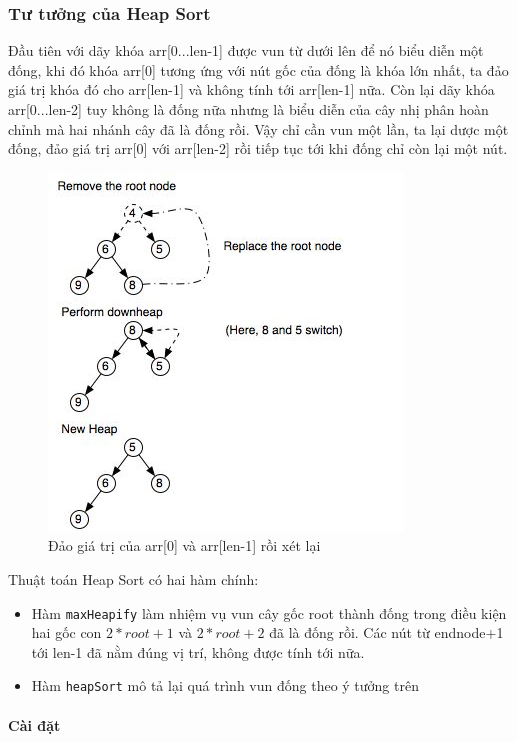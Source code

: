\documentclass[a4paper,12pt]{report}
\newcommand{\mnt}[1]{\inputminted[frame=single, linenos=true, tabsize=4]{c++}{#1}}
\begin{document}
\subsubsection{Tư tưởng của Heap Sort}

Đầu tiên với dãy khóa arr[0...len-1] được vun từ dưới lên để nó biểu diễn một đống, khi đó khóa arr[0] tương ứng với nút gốc của đống là khóa lớn nhất, ta đảo giá trị khóa đó cho arr[len-1] và không tính tới arr[len-1] nữa. Còn lại dãy khóa arr[0...len-2] tuy không là đống nữa nhưng là biểu diễn của cây nhị phân hoàn chỉnh mà hai nhánh cây đã là đống rồi. Vậy chỉ cần vun một lần, ta lại dược một đống, đảo giá trị arr[0] với arr[len-2] rồi tiếp tục tới khi đống chỉ còn lại một nút.
\begin{figure}[htp]
\centering
\includegraphics[scale=0.5]{img/tachdong.jpg}
\caption{Đảo giá trị của arr[0] và arr[len-1] rồi xét lại}
\label{}
\end{figure}

Thuật toán Heap Sort có hai hàm chính:

\begin{itemize}
\item Hàm \texttt{maxHeapify} làm nhiệm vụ vun cây gốc root thành đống trong điều kiện hai gốc con $2*root+1$ và $2*root+2$ đã là đống rồi. Các nút từ endnode+1 tới len-1 đã nằm đúng vị trí, không được tính tới nữa.
\item Hàm \texttt{heapSort} mô tả lại quá trình vun đống theo ý tưởng trên
\end{itemize}

\paragraph{Cài đặt}
\mnt{src/heapsort.cpp}
\end{document}
